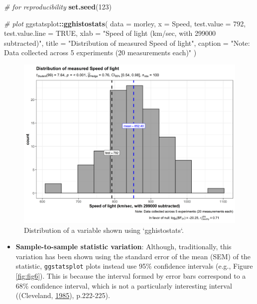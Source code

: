 \documentclass[
]{article}
\newenvironment{Shaded}{\begin{snugshade}}{\end{snugshade}}
\newcommand{\CommentTok}[1]{\textcolor[rgb]{0.56,0.35,0.01}{\textit{#1}}}
\newcommand{\DataTypeTok}[1]{\textcolor[rgb]{0.13,0.29,0.53}{#1}}
\newcommand{\DecValTok}[1]{\textcolor[rgb]{0.00,0.00,0.81}{#1}}
\newcommand{\KeywordTok}[1]{\textcolor[rgb]{0.13,0.29,0.53}{\textbf{#1}}}
\newcommand{\NormalTok}[1]{#1}
\newcommand{\OperatorTok}[1]{\textcolor[rgb]{0.81,0.36,0.00}{\textbf{#1}}}
\newcommand{\OtherTok}[1]{\textcolor[rgb]{0.56,0.35,0.01}{#1}}
\newcommand{\StringTok}[1]{\textcolor[rgb]{0.31,0.60,0.02}{#1}}
\providecommand{\tightlist}{%
  \setlength{\itemsep}{0pt}\setlength{\parskip}{0pt}}
\begin{document}
\begin{Shaded}
\begin{Highlighting}[]
\CommentTok{\# for reproducibility}
\KeywordTok{set.seed}\NormalTok{(}\DecValTok{123}\NormalTok{)}

\CommentTok{\# plot}
\NormalTok{ggstatsplot}\OperatorTok{::}\KeywordTok{gghistostats}\NormalTok{(}
  \DataTypeTok{data =}\NormalTok{ morley,}
  \DataTypeTok{x =}\NormalTok{ Speed,}
  \DataTypeTok{test.value =} \DecValTok{792}\NormalTok{,}
  \DataTypeTok{test.value.line =} \OtherTok{TRUE}\NormalTok{,}
  \DataTypeTok{xlab =} \StringTok{"Speed of light (km/sec, with 299000 subtracted)"}\NormalTok{,}
  \DataTypeTok{title =} \StringTok{"Distribution of measured Speed of light"}\NormalTok{,}
  \DataTypeTok{caption =} \StringTok{"Note: Data collected across 5 experiments (20 measurements each)"}
\NormalTok{)}
\end{Highlighting}
\end{Shaded}

\begin{figure}[H]
\includegraphics[width=1\linewidth]{./figures/paper-fig5-1} \caption{Distribution of a variable shown using `gghistostats`.}\label{fig:fig5}
\end{figure}

\begin{itemize}
\tightlist
\item
  \textbf{Sample-to-sample statistic variation}: Although, traditionally, this
  variation has been shown using the standard error of the mean (SEM) of the
  statistic, \texttt{ggstatsplot} plots instead use 95\% confidence intervals (e.g.,
  Figure \ref{fig:fig6}). This is because the interval formed by error bars
  correspond to a 68\% confidence interval, which is not a particularly
  interesting interval ((Cleveland, \protect\hyperlink{ref-clevelandElementsGraphingData1985}{1985}), p.222-225).
\end{itemize}
\end{document}
